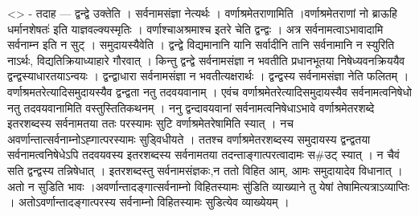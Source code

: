 \textless{}\textgreater{} - तदाह --- द्वन्द्वे उक्तेति । सर्वनामसंज्ञा
नेत्यर्थः । वर्णाश्रमेतराणामिति ।वर्णाश्रमेतराणां नो ब्राऊहि
धर्मानशेषतः॑ इति याज्ञवल्क्यस्मृतिः । वर्णाश्चाअश्रमाश्च इतरे चेति
द्वन्द्वः । अत्र सर्वनामत्वाऽभावादामि सर्वनाम्न इति न सुट् ।
समुदायस्यैवेति । द्वन्द्वे विद्यमानानि यानि सर्वादीनि तानि सर्वनामानि न
स्युरिति नाऽर्थः, विद्यतिक्रियाध्याहारे गौरवात् । किन्तु द्वन्द्वे
सर्वनामसंज्ञा न भवतीति प्रधानभूतया निषेध्यवनक्रिययैव
द्वन्द्वस्याधारतयाऽन्वयः । द्वन्द्वाधारा सर्वनामसंज्ञा न
भवतीत्यक्षरार्थः । द्वन्द्वस्य सर्वनामसंज्ञा नेति फलितम् ।
वर्णाश्रमतरेत्यादिसमुदायस्यैव द्वन्द्वता नतु तदवयवानाम् । एवंच
वर्णाश्रमेतरेत्यादिसमुदायस्यैव सर्वनामत्वनिषेधो नतु तदवयवानामिति
वस्तुस्तितिकथनम् । ननु द्वन्दावयवानां सर्वनामत्वनिषेधाऽभावे
वर्णाश्रमेतरशब्दे इतरशब्दस्य सर्वनामतया ततः परस्यामः सुटि
वर्णाश्रमेतरेषामिति स्यात् । नच अवर्णान्तात्सर्वनाम्नोऽह्गात्परस्यामः
सुड्विधीयते । ततश्च वर्णाश्रमेतरशब्दस्य समुदायस्य द्वन्द्वतया
सर्वनामत्वनिषेधेऽपि तदवयवस्य इतरशब्दस्य सर्वनामतया
तदन्ताङ्गात्परत्वादामः स\#उट् स्यात् । न चैवं सति द्वन्द्वस्य
तन्निषेधात् । इतरशब्दस्तु सर्वनामसंज्ञकः,न ततो विहित आम्, आमः समुदायादेव
विधानात् । अतो न सुडिति भावः ।अवर्णान्तादङ्गात्सर्वनाम्नो विहितस्यामः
सु॑डिति व्याख्याने तु येषां तेषामित्यत्राऽव्याप्तिः ।
अतोऽवर्णान्तादङ्गात्परस्य सर्वनाम्नो विहितस्यामः सुडित्येव व्याख्येयम् ।
